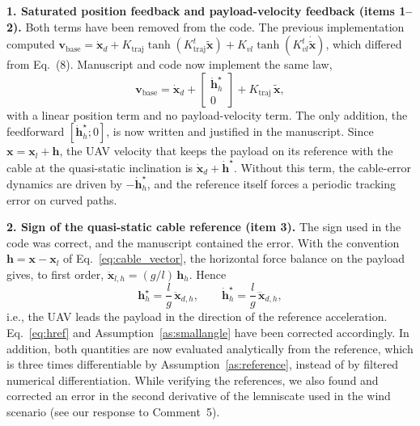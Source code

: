 \begin{reply}
\medskip
\noindent\textbf{1. Saturated position feedback and payload-velocity feedback (items 1--2).}
Both terms have been removed from the code. The previous implementation computed
$\mathbf{v}_{\mathrm{base}}=\dot{\mathbf{x}}_d+K_{\mathrm{traj}}\tanh(K^t_{\mathrm{traj}}\tilde{\mathbf{x}})+K_{vl}\tanh(K^t_{vl}\dot{\tilde{\mathbf{x}}})$, which differed from Eq.~(8). Manuscript and code now implement the same law,
\begin{equation*}
\mathbf{v}_{\mathrm{base}}=\dot{\mathbf{x}}_d+\begin{bmatrix}\dot{\mathbf{h}}_h^\star\\0\end{bmatrix}+K_{\mathrm{traj}}\,\tilde{\mathbf{x}},
\end{equation*}
with a linear position term and no payload-velocity term. The only addition, the feedforward $[\dot{\mathbf{h}}_h^\star;0]$, is now written and justified in the manuscript. Since $\mathbf{x}=\mathbf{x}_l+\mathbf{h}$, the UAV velocity that keeps the payload on its reference with the cable at the quasi-static inclination is $\dot{\mathbf{x}}_d+\dot{\mathbf{h}}^\star$. Without this term, the cable-error dynamics are driven by $-\dot{\mathbf{h}}^\star_h$, and the reference itself forces a periodic tracking error on curved paths.

\medskip
\noindent\textbf{2. Sign of the quasi-static cable reference (item 3).}
The sign used in the code was correct, and the manuscript contained the error. With the convention $\mathbf{h}=\mathbf{x}-\mathbf{x}_l$ of Eq.~\eqref{eq:cable_vector}, the horizontal force balance on the payload gives, to first order, $\ddot{\mathbf{x}}_{l,h}=(g/l)\,\mathbf{h}_h$. Hence
\begin{equation*}
\mathbf{h}_h^\star=\frac{l}{g}\,\ddot{\mathbf{x}}_{d,h},\qquad \dot{\mathbf{h}}_h^\star=\frac{l}{g}\,\dddot{\mathbf{x}}_{d,h},
\end{equation*}
i.e., the UAV leads the payload in the direction of the reference acceleration. Eq.~\eqref{eq:href} and Assumption~\ref{as:smallangle} have been corrected accordingly. In addition, both quantities are now evaluated analytically from the reference, which is three times differentiable by Assumption~\ref{as:reference}, instead of by filtered numerical differentiation. While verifying the references, we also found and corrected an error in the second derivative of the lemniscate used in the wind scenario (see our response to Comment~5).


\end{reply}
